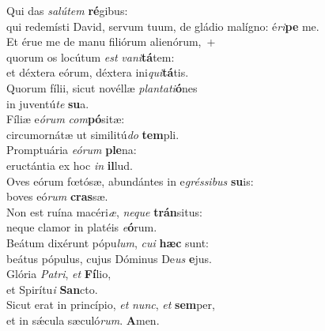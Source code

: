 \evenverse Qui das \textit{sa}\textit{lú}\textit{tem} \textbf{ré}gibus:~\*\\
\evenverse qui redemísti David, servum tuum, de gládio malígno: é\textit{ri}\textbf{pe} me.\\
\oddverse Et érue me de manu filiórum alienórum,~+\\
\oddverse  quorum os locútum \textit{est} \textit{va}\textit{ni}\textbf{tá}tem:~\*\\
\oddverse et déxtera eórum, déxtera ini\textit{qui}\textbf{tá}tis.\\
\evenverse Quorum fílii, sicut novéllæ \textit{plan}\textit{ta}\textit{ti}\textbf{ó}nes~\*\\
\evenverse in juventú\textit{te} \textbf{su}a.\\
\oddverse Fíliæ e\textit{ó}\textit{rum} \textit{com}\textbf{pó}sitæ:~\*\\
\oddverse circumornátæ ut similitú\textit{do} \textbf{tem}pli.\\
\evenverse Promptuária \textit{e}\textit{ó}\textit{rum} \textbf{ple}na:~\*\\
\evenverse eructántia ex hoc \textit{in} \textbf{il}lud.\\
\oddverse Oves eórum fœtósæ, abundántes in e\textit{grés}\textit{si}\textit{bus} \textbf{su}is:~\*\\
\oddverse boves eó\textit{rum} \textbf{cras}sæ.\\
\evenverse Non est ruína macéri\textit{æ}, \textit{ne}\textit{que} \textbf{trán}situs:~\*\\
\evenverse neque clamor in platéis \textit{e}\textbf{ó}rum.\\
\oddverse Beátum dixérunt pópu\textit{lum}, \textit{cu}\textit{i} \textbf{hæc} sunt:~\*\\
\oddverse beátus pópulus, cujus Dóminus De\textit{us} \textbf{e}jus.\\
\evenverse Glória \textit{Pa}\textit{tri}, \textit{et} \textbf{Fí}lio,~\*\\
\evenverse et Spirítu\textit{i} \textbf{San}cto.\\
\oddverse Sicut erat in princípio, \textit{et} \textit{nunc}, \textit{et} \textbf{sem}per,~\*\\
\oddverse et in sǽcula sæculó\textit{rum}. \textbf{A}men.\\
